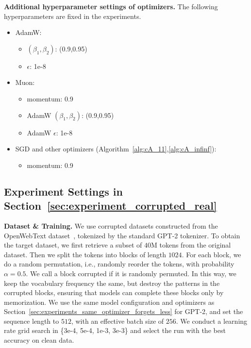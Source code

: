 \documentclass{article}
\theoremstyle{remark}
\begin{document}
\textbf{Additional hyperparameter settings of optimizers.} The following hyperparameters are fixed in the experiments.
\begin{itemize}
    \item AdamW:
    \begin{itemize}
        \item $(\beta_1,\beta_2)$: (0.9,0.95)
        \item $\epsilon$: 1e-8
    \end{itemize}
    \item Muon:
    \begin{itemize}
        \item momentum: 0.9
        \item AdamW $(\beta_1,\beta_2)$: (0.9,0.95)
        \item AdamW $\epsilon$: 1e-8
    \end{itemize}
    \item SGD and other optimizers (Algorithm~\ref{alg:cA_11},\ref{alg:cA_infinf}):
    \begin{itemize}
        \item momentum: 0.9
    \end{itemize}
\end{itemize}


\subsection{Experiment Settings in Section~\ref{sec:experiment_corrupted_real}}\label{appendix:experiment_setting_corrupted_real}

\textbf{Dataset \& Training.} 
We use corrupted datasets constructed from the OpenWebText dataset~\citep{gokaslan2019openWeb}, tokenized by the standard GPT-2 tokenizer. To obtain the target dataset, we first retrieve a subset of $40$M tokens from the original dataset. Then we split the tokens into blocks of length $1024$. For each block, we do a random permutation, i.e., randomly reorder the tokens, with probability $\alpha=0.5$. We call a block corrupted if it is randomly permuted. In this way, we keep the vocabulary frequency the same, but destroy the patterns in the corrupted blocks, ensuring that models can complete these blocks only by memorization. 
We use the same model configuration and optimizers as Section~\ref{sec:experiments_same_optimizer_forgets_less} for GPT-2, and set the sequence length to $512$, with an effective batch size of $256$. We conduct a learning rate grid search in \{3e-4, 5e-4, 1e-3, 3e-3\} and select the run with the best accuracy on clean data.
\end{document}
